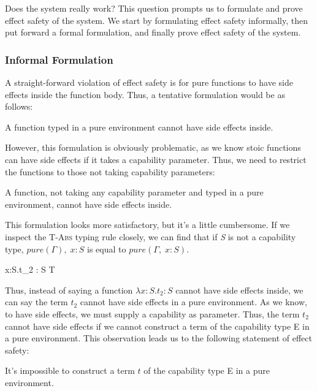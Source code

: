 Does the system really work? This question prompts us to formulate and
prove effect safety of the system. We start by formulating effect
safety informally, then put forward a formal formulation, and finally
prove effect safety of the system.

\subsubsection{Informal Formulation}

A straight-forward violation of effect safety is for pure functions to
have side effects inside the function body. Thus, a tentative
formulation would be as follows:

\begin{definition}
A function typed in a pure environment cannot have side effects inside.
\end{definition}

However, this formulation is obviously problematic, as we know stoic
functions can have side effects if it takes a capability
parameter. Thus, we need to restrict the functions to those not taking
capability parameters:

\begin{definition}
  A function, not taking any capability parameter and typed in a pure
  environment, cannot have side effects inside.
\end{definition}

This formulation looks more satisfactory, but it's a little
cumbersome. If we inspect the \textsc{T-Abs} typing rule closely, we
can find that if \emph{S} is not a capability type,
$pure(\Gamma),\; x: S$ is equal to $pure(\Gamma,\; x: S)$.

{ \Gamma \vdash \lambda x:S.\;t_2 : S \to T }

Thus, instead of saying a function $\lambda x:S.t_2 : S$ cannot have
side effects inside, we can say the term $t_2$ cannot have side
effects in a pure environment. As we know, to have side effects, we
must supply a capability as parameter. Thus, the term $t_2$ cannot
have side effects if we cannot construct a term of the capability type
E in a pure environment. This observation leads us to the following
statement of effect safety:

\begin{definition}
  It's impossible to construct a term $t$ of the capability type E in
  a pure environment.
\end{definition}

